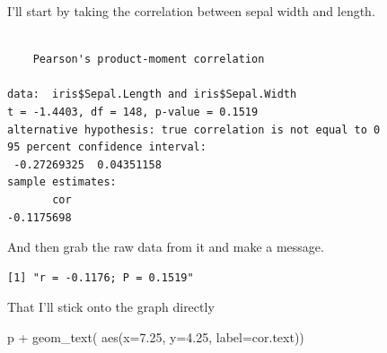 \documentclass[
  letterpaper,
]{book}
\newenvironment{Shaded}{\begin{snugshade}}{\end{snugshade}}
\newcommand{\AttributeTok}[1]{\textcolor[rgb]{0.40,0.45,0.13}{#1}}
\newcommand{\DecValTok}[1]{\textcolor[rgb]{0.68,0.00,0.00}{#1}}
\newcommand{\FloatTok}[1]{\textcolor[rgb]{0.68,0.00,0.00}{#1}}
\newcommand{\FunctionTok}[1]{\textcolor[rgb]{0.28,0.35,0.67}{#1}}
\newcommand{\NormalTok}[1]{\textcolor[rgb]{0.00,0.23,0.31}{#1}}
\newcommand{\OtherTok}[1]{\textcolor[rgb]{0.00,0.23,0.31}{#1}}
\newcommand{\SpecialCharTok}[1]{\textcolor[rgb]{0.37,0.37,0.37}{#1}}
\newcommand{\StringTok}[1]{\textcolor[rgb]{0.13,0.47,0.30}{#1}}
\begin{document}
I'll start by taking the correlation between sepal width and length.

\begin{Shaded}
\end{Shaded}

\begin{verbatim}

    Pearson's product-moment correlation

data:  iris$Sepal.Length and iris$Sepal.Width
t = -1.4403, df = 148, p-value = 0.1519
alternative hypothesis: true correlation is not equal to 0
95 percent confidence interval:
 -0.27269325  0.04351158
sample estimates:
       cor 
-0.1175698 
\end{verbatim}

And then grab the raw data from it and make a message.

\begin{Shaded}
\end{Shaded}

\begin{verbatim}
[1] "r = -0.1176; P = 0.1519"
\end{verbatim}

That I'll stick onto the graph directly

\begin{Shaded}
\begin{Highlighting}[]
\NormalTok{p }\SpecialCharTok{+} \FunctionTok{geom\_text}\NormalTok{( }\FunctionTok{aes}\NormalTok{(}\AttributeTok{x=}\FloatTok{7.25}\NormalTok{, }\AttributeTok{y=}\FloatTok{4.25}\NormalTok{, }\AttributeTok{label=}\NormalTok{cor.text))}
\end{Highlighting}
\end{Shaded}
\end{document}
